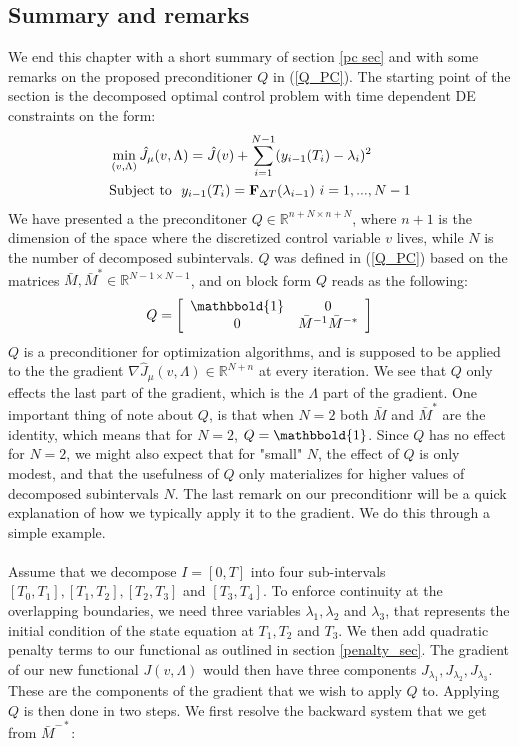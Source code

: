 \subsection{Summary and remarks}
We end this chapter with a short summary of section \ref{pc sec} and with some remarks on the proposed preconditioner $Q$ in (\ref{Q_PC}). The starting point of the section is the decomposed optimal control problem with time dependent DE constraints on the form:
\begin{align}
&\min_{(v,\Lambda)}\hat J_{\mu}(v,\Lambda) =\hat{J}(v)+ \sum_{i=1}^{N-1} (y_{i-1}(T_{i})-\lambda_{i})^2  \\
&\textrm{Subject to } \ y_{i-1}(T_{i}) = \bold F_{\Delta T}(\lambda_{i-1}) \ i=1,...,N-1 
\end{align}
We have presented a the preconditoner $Q\in\mathbb{R}^{n+N\times n+N}$, where $n+1$ is the dimension of the space where the discretized control variable $v$ lives, while $N$ is the number of decomposed subintervals. $Q$ was defined in (\ref{Q_PC}) based on the matrices $\bar M,\bar M^*\in\mathbb{R}^{N-1\times N-1}$, and on block form $Q$ reads as the following:
\begin{align*}
Q = \left[ \begin{array}{cc}
	\mathbbold{1} & 0 \\
	0 &  \bar{M}^{-1}\bar{M}^{-*}\\
	\end{array} \right] 
\end{align*}
$Q$ is a preconditioner for optimization algorithms, and is supposed to be applied to the the gradient $\nabla \hat J_{\mu}(v,\Lambda)\in\mathbb{R}^{N+n}$ at every iteration. We see that $Q$ only effects the last part of the gradient, which is the $\Lambda$ part of the gradient. One important thing of note about $Q$, is that when $N=2$ both $\bar M$ and $\bar M^*$ are the identity, which means that for $N=2$, $Q=\mathbbold{1}$. Since $Q$ has no effect for $N=2$, we might also expect that for "small" $N$, the effect of $Q$ is only modest, and that the usefulness of $Q$ only materializes for higher values of decomposed subintervals $N$. The last remark on our preconditionr will be a quick explanation of how we typically apply it to the gradient. We do this through a simple example.   
\\
\\
Assume that we decompose $I=[0,T]$ into four sub-intervals $[T_0,T_1], [T_1,T_2], [T_2,T_3]$ and $[T_3,T_4]$. To enforce continuity at the overlapping boundaries, we need three variables $\lambda_1,\lambda_2$ and $\lambda_3$, that represents the initial condition of the state equation at $T_1,T_2$ and $T_3$. We then add quadratic penalty terms to our functional as outlined in section \ref{penalty_sec}. The gradient of our new functional $J(v,\Lambda)$ would then have three components $J_{\lambda_1}, J_{\lambda_2}, J_{\lambda_3}$. These are the components of the gradient that we wish to apply $Q$ to. Applying $Q$ is then done in two steps. We first resolve the backward system that we get from $\bar M^{-*}$:
